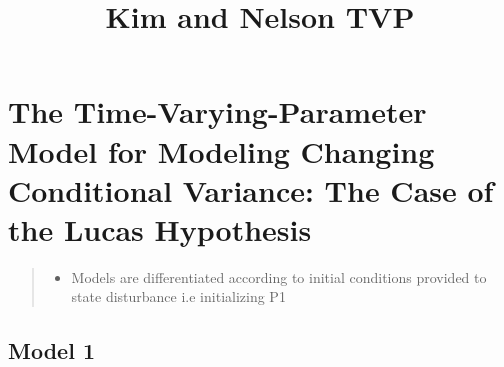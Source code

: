 \documentclass[11pt]{article}
\title{Kim and Nelson TVP}
\providecommand{\tightlist}{%
      \setlength{\itemsep}{0pt}\setlength{\parskip}{0pt}}
\begin{document}
    
    
    \maketitle
    
    

    
    \section{The Time-Varying-Parameter Model for Modeling Changing
Conditional Variance: The Case of the Lucas
Hypothesis}\label{the-time-varying-parameter-model-for-modeling-changing-conditional-variance-the-case-of-the-lucas-hypothesis}

\begin{quote}
\begin{itemize}
\tightlist
\item
  Models are differentiated according to initial conditions provided to
  state disturbance i.e initializing P1
\end{itemize}
\end{quote}

\subsection{Model 1}\label{model-1}
\end{document}
